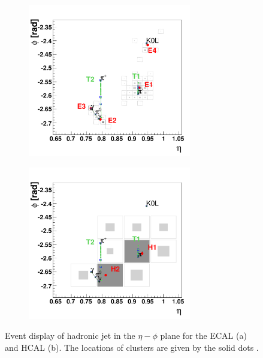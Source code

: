\begin{figure}[tbh]
\begin{subfigure}{0.45\textwidth}
\centering
\includegraphics[width=2.8in]{figures/PFb.pdf}
\caption{}
\end{subfigure}
\begin{subfigure}{0.45\textwidth}
\centering
\includegraphics[width=2.8in]{figures/PFc.pdf}
\caption{}
\end{subfigure}
\caption{Event display of hadronic jet in the $\eta-\phi$ plane for the ECAL (a) and HCAL (b). The locations of clusters are given by the solid dots \cite{CMS:2009nxa}.}
\label{fig:pf2}
\end{figure}

